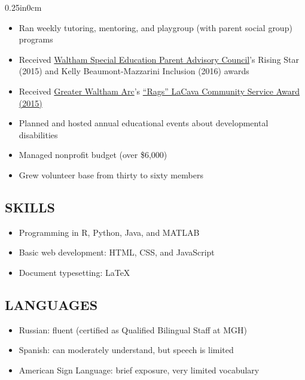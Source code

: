 \documentclass[11pt]{article}
\newcommand{\mysec}[1]{\subsection*{\uppercase{#1}}}
\newcommand{\blockindent}{0.25in}
\begin{document}
\begin{adjustwidth}{\blockindent}{0cm}
\begin{itemize}
	\item Ran weekly tutoring, mentoring, and playgroup (with parent social group) programs

	\item Received \href{https://www.facebook.com/WSEPAC/home}{Waltham Special Education Parent Advisory Council}'s Rising Star (2015) and Kelly Beaumont-Mazzarini Inclusion (2016) awards

	\item Received \href{http://www.gwarc.org/}{Greater Waltham Arc}'s \href{http://www.gwarc.org/newsdetail/annual-meeting-2015/}{``Rags'' LaCava Community Service Award (2015)}

	\item Planned and hosted annual educational events about developmental disabilities

	\item Managed nonprofit budget (over \$6,000)

	\item Grew volunteer base from thirty to sixty members

\end{itemize}

\end{adjustwidth}


\mysec{Skills}

\begin{itemize}

	\item Programming in R, Python, Java, and MATLAB

	\item Basic web development: HTML, CSS, and JavaScript

	\item Document typesetting: \LaTeX

\end{itemize}


\mysec{Languages}

	\begin{itemize}

		\item Russian: fluent (certified as Qualified Bilingual Staff at MGH)

		\item Spanish: can moderately understand, but speech is limited

		\item American Sign Language: brief exposure, very limited vocabulary

	\end{itemize}
\end{document}
